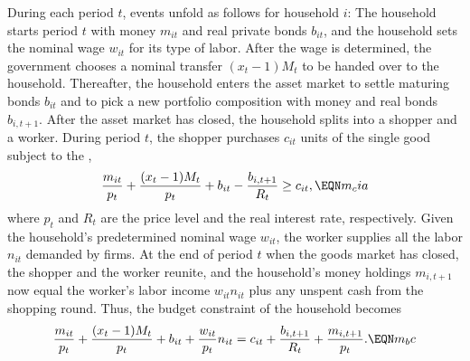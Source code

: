 During each period $t$, events unfold as follows for household $i$:
The household starts
period $t$ with money $m_{it}$ and real private bonds $b_{it}$, and the
household sets the nominal wage $w_{it}$ for its type of labor.
After the wage is determined, the government chooses a nominal transfer
$(x_t-1)M_t$ to be handed over to the household. Thereafter,
the household enters the asset market to settle maturing bonds $b_{it}$
and to pick a new portfolio composition with money and real bonds $b_{i,t+1}$.
After the asset market has closed, the household splits into
a shopper and a worker.
During period $t$, the shopper purchases $c_{it}$ units of the single good
subject to the ,
$$
{m_{it} \over p_t} + {(x_t-1) M_t \over p_t} + b_{it} - {b_{i,t+1} \over R_t}
\geq c_{it},                                                \EQN m_cia
$$
where $p_t$ and $R_t$ are the price level and the real interest
rate, respectively. Given the household's predetermined nominal
wage $w_{it}$,
the worker supplies all the labor $n_{it}$ demanded by firms.
At the end of period $t$ when the goods market has closed,
the shopper and the worker reunite, and the household's money holdings
$m_{i,t+1}$ now equal the worker's labor income
$w_{it} n_{it}$ plus any unspent cash from the shopping round. Thus,
the budget constraint of the household becomes
$$
{m_{it} \over p_t} + {(x_t-1) M_t \over p_t} + b_{it} +
{w_{it} \over p_t} n_{it}
= c_{it} + {b_{i,t+1} \over R_t} + {m_{i,t+1} \over p_t}.       \EQN m_bc
$$




